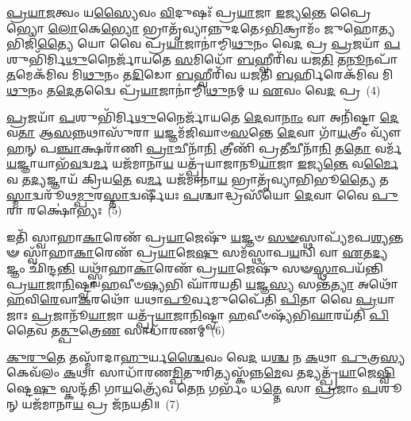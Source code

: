 \-\ul{𑌪𑍍𑌰}\-\-\ul{𑌯𑌾}\-\-\ul{𑌜}\-𑌤𑍍𑌵𑌂 𑌯\-\ul{𑌸𑍍𑌯𑍈}\-𑌵𑌂 \ul{𑌵𑌿}\-𑌦𑍁𑌷𑌃᳴ 𑌪𑍍𑌰\-\ul{𑌯𑌾}\-𑌜𑌾 \ul{𑌇}\-𑌜𑍍𑌯\-\ul{𑌨𑍍𑌤𑍇} 𑌪𑍍𑌰𑍈𑌭𑍍𑌯𑍋 \ul{𑌲𑍋}\-𑌕𑍇\-\ul{𑌭𑍍𑌯𑍋} 𑌭𑍍𑌰𑌾𑌤𑍃᳴𑌵𑍍𑌯𑌾𑌨𑍍𑌨𑍁𑌦𑌤𑍇\-𑌽\-\ul{𑌭𑌿}\-𑌕𑍍𑌰𑌾𑌮𑌂᳴ 𑌜𑍁𑌹𑍋\-\ul{𑌤𑍍𑌯}\-𑌭𑌿𑌜𑌿᳴\-\ul{𑌤𑍍𑌯𑍈} 𑌯𑍋 𑌵𑍈 𑌪𑍍𑌰᳴\-\ul{𑌯𑌾}\-𑌜𑌾𑌨𑌾॑𑌮𑍍𑌮𑌿\-\ul{𑌥𑍁}\-𑌨𑌂 𑌵𑍇\-\ul{𑌦} 𑌪𑍍𑌰 \ul{𑌪𑍍𑌰}\-𑌜𑌯𑌾᳴ \ul{𑌪}\-𑌶𑍁𑌭𑌿᳴𑌰𑍍𑌮𑌿\-\ul{𑌥𑍁}\-𑌨𑍈𑌰𑍍𑌜𑌾᳴𑌯𑌤𑍇 \ul{𑌸}\-𑌮𑌿𑌧𑍋᳴ \ul{𑌬}\-𑌹𑍍𑌵𑍀𑌰𑌿᳴𑌵 𑌯𑌜\-\ul{𑌤𑌿} 𑌤\-\ul{𑌨𑍂}\-𑌨𑌪𑌾᳴\-\ul{𑌤}\-𑌮𑍇𑌕᳴𑌮𑌿𑌵 𑌮𑌿\-\ul{𑌥𑍁}\-𑌨𑌂 𑌤\-\ul{𑌦𑌿}\-𑌡𑍋 \ul{𑌬}\-𑌹𑍍𑌵𑍀𑌰𑌿᳴𑌵 𑌯𑌜𑌤𑌿 \ul{𑌬}\-𑌰𑍍\mbox{}𑌹𑌿𑌰𑍇𑌕᳴𑌮𑌿𑌵 𑌮𑌿\-\ul{𑌥𑍁}\-𑌨𑌂 𑌤\-\ul{𑌦𑍇}\-𑌤𑌦𑍍𑌵𑍈 𑌪𑍍𑌰᳴\-\ul{𑌯𑌾}\-𑌜𑌾𑌨𑌾॑𑌮𑍍𑌮𑌿\-\ul{𑌥𑍁}\-𑌨𑌮𑍍 𑌯 \ul{𑌏}\-𑌵𑌂 𑌵𑍇\-\ul{𑌦} 𑌪𑍍𑌰~(4)

\-\ul{𑌪𑍍𑌰}\-𑌜𑌯𑌾᳴ \ul{𑌪}\-𑌶𑍁𑌭𑌿᳴𑌰𑍍𑌮𑌿\-\ul{𑌥𑍁}\-𑌨𑍈𑌰𑍍𑌜𑌾᳴𑌯𑌤𑍇 \ul{𑌦𑍇}\-𑌵𑌾\-\ul{𑌨𑌾𑌂} 𑌵𑌾 𑌅𑌨𑌿᳴𑌷𑍍𑌟𑌾 \ul{𑌦𑍇}\-𑌵\-\ul{𑌤𑌾} 𑌆\-\ul{𑌸}\-𑌨𑍍𑌨𑌥𑌾𑌸𑍁᳴𑌰𑌾 \ul{𑌯}\-𑌜𑍍𑌞𑌮᳴𑌜𑌿𑌘𑌾𑍞\-\ul{𑌸}\-𑌨𑍍𑌤𑍇 \ul{𑌦𑍇}\-𑌵𑌾 𑌗𑌾᳴\-\ul{𑌯}\-𑌤𑍍𑌰𑍀𑌂 𑌵𑍍𑌯𑍗᳴\-\ul{𑌹}\-𑌨𑍍 𑌪\-\ul{𑌞𑍍𑌚𑌾}\-𑌕𑍍𑌷𑌰𑌾᳴𑌣𑌿 \ul{𑌪𑍍𑌰𑌾}\-𑌚𑍀𑌨𑌾᳴\-\ul{𑌨𑌿} 𑌤𑍍𑌰𑍀𑌣𑌿᳴ 𑌪𑍍𑌰\-\ul{𑌤𑍀}\-𑌚𑍀𑌨𑌾᳴\-\ul{𑌨𑌿} 𑌤\-\ul{𑌤𑍋} 𑌵𑌰𑍍𑌮᳴ \ul{𑌯}\-𑌜𑍍𑌞𑌾𑌯𑌾𑌭᳴\-\ul{𑌵}\-𑌦𑍍𑌵\-\ul{𑌰𑍍𑌮} 𑌯𑌜᳴𑌮𑌾𑌨𑌾\-\ul{𑌯} 𑌯𑌤𑍍𑌪𑍍𑌰᳴𑌯𑌾𑌜𑌾𑌨𑍂\-\ul{𑌯𑌾}\-𑌜𑌾 \ul{𑌇}\-𑌜𑍍𑌯\-\ul{𑌨𑍍𑌤𑍇} 𑌵\-\ul{𑌰𑍍𑌮𑍈}\-𑌵 𑌤\-\ul{𑌦𑍍𑌯}\-𑌜𑍍𑌞𑌾𑌯᳴ 𑌕𑍍𑌰𑌿𑌯\-\ul{𑌤𑍇} 𑌵\-\ul{𑌰𑍍𑌮} 𑌯𑌜᳴𑌮𑌾𑌨𑌾\-\ul{𑌯} 𑌭𑍍𑌰𑌾𑌤𑍃᳴𑌵𑍍𑌯𑌾𑌭𑌿𑌭𑍂\-\ul{𑌤𑍍𑌯𑍈} 𑌤\-\ul{𑌸𑍍𑌮𑌾}\-𑌦𑍍𑌵𑌰𑍂᳴𑌥\-\ul{𑌮𑍍𑌪𑍁}\-𑌰\-\ul{𑌸𑍍𑌤𑌾}\-𑌦𑍍𑌵𑌰𑍍\mbox{}𑌷𑍀᳴𑌯𑌃 \ul{𑌪}\-𑌶𑍍𑌚𑌾𑌦𑍍𑌧𑍍𑌰𑌸𑍀᳴𑌯𑍋 \ul{𑌦𑍇}\-𑌵𑌾 𑌵𑍈 \ul{𑌪𑍁}\-𑌰𑌾 𑌰𑌕𑍍𑌷𑍋॑𑌭𑍍𑌯𑌃~(5)

𑌇𑌤𑌿᳴ 𑌸𑍍𑌵𑌾𑌹𑌾\-\ul{𑌕𑌾}\-𑌰𑍇𑌣᳴ 𑌪𑍍𑌰\-\ul{𑌯𑌾}\-𑌜𑍇𑌷𑍁᳴ \ul{𑌯}\-𑌜𑍍𑌞𑍞 \ul{𑌸}\-\-\ul{𑍟}\-𑌸𑍍𑌥𑌾𑌪𑍍𑌯᳴𑌮𑌪\-\ul{𑌶𑍍𑌯}\-𑌨𑍍𑌤𑍟 𑌸𑍍𑌵𑌾᳴𑌹𑌾\-\ul{𑌕𑌾}\-𑌰𑍇𑌣᳴ 𑌪𑍍𑌰\-\ul{𑌯𑌾}\-𑌜𑍇\-\ul{𑌷𑍁} 𑌸𑌮᳴𑌸𑍍𑌥𑌾𑌪\-\ul{𑌯}\-𑌨𑍍𑌵𑌿 𑌵𑌾 \ul{𑌏}\-𑌤\-\ul{𑌦𑍍𑌯}\-𑌜𑍍𑌞𑌂 𑌛𑌿᳴𑌨𑍍𑌦\-\ul{𑌨𑍍𑌤𑌿} 𑌯𑌥𑍍𑌸𑍍𑌵𑌾᳴𑌹𑌾\-\ul{𑌕𑌾}\-𑌰𑍇𑌣᳴ 𑌪𑍍𑌰\-\ul{𑌯𑌾}\-𑌜𑍇𑌷𑍁᳴ 𑌸𑍟\-\ul{𑌸𑍍𑌥𑌾}\-𑌪𑌯᳴𑌨𑍍𑌤𑌿 𑌪𑍍𑌰\-\ul{𑌯𑌾}\-𑌜𑌾\-\ul{𑌨𑌿}\-𑌷𑍍𑌟𑍍𑌵𑌾 \ul{𑌹}\-𑌵𑍀𑍞\-\ul{𑌷𑍍𑌯}\-𑌭𑌿 𑌘𑌾᳴𑌰𑌯𑌤𑌿 \ul{𑌯}\-𑌜𑍍𑌞\-\ul{𑌸𑍍𑌯} 𑌸𑌨𑍍𑌤᳴\-\ul{𑌤𑍍𑌯𑌾} 𑌅𑌥𑍋᳴ \ul{𑌹}\-𑌵𑌿\-\ul{𑌰𑍇}\-𑌵𑌾\-\ul{𑌕}\-𑌰𑌥𑍋᳴ 𑌯𑌥𑌾\-\ul{𑌪𑍂}\-𑌰𑍍𑌵𑌮𑍁𑌪𑍈᳴𑌤𑌿 \ul{𑌪𑌿}\-𑌤𑌾 𑌵𑍈 \ul{𑌪𑍍𑌰}\-𑌯𑌾𑌜𑌾𑌃 \ul{𑌪𑍍𑌰}\-𑌜𑌾𑌨𑍂᳴\-\ul{𑌯𑌾}\-𑌜𑌾 𑌯𑌤𑍍𑌪𑍍𑌰᳴\-\ul{𑌯𑌾}\-𑌜𑌾\-\ul{𑌨𑌿}\-𑌷𑍍𑌟𑍍𑌵𑌾 \ul{𑌹}\-𑌵𑍀𑍞𑌷𑍍𑌯᳴𑌭𑌿\-\ul{𑌘𑌾}\-𑌰𑌯᳴𑌤𑌿 \ul{𑌪𑌿}\-𑌤𑍈𑌵 𑌤\-\ul{𑌤𑍍𑌪𑍁}\-𑌤𑍍𑌰𑍇\-\ul{𑌣} 𑌸𑌾𑌧𑌾᳴𑌰𑌣𑌮𑍍~(6)

\-\ul{𑌕𑍁}\-\-\ul{𑌰𑍁}\-\-\ul{𑌤𑍇} 𑌤𑌸𑍍𑌮𑌾᳴𑌦𑌾\-\ul{𑌹𑍁}\-𑌰𑍍𑌯\-\ul{𑌶𑍍𑌚𑍈}\-𑌵𑌂 𑌵𑍇\-\ul{𑌦} 𑌯\-\ul{𑌶𑍍𑌚} 𑌨 \ul{𑌕}\-𑌥𑌾 \ul{𑌪𑍁}\-𑌤𑍍𑌰\-\ul{𑌸𑍍𑌯} 𑌕𑍇𑌵᳴𑌲𑌂 \ul{𑌕}\-𑌥𑌾 𑌸𑌾𑌧𑌾᳴𑌰𑌣\-\ul{𑌮𑍍𑌪𑌿}\-𑌤𑍁𑌰𑌿𑌤𑍍𑌯𑌸𑍍𑌕᳴𑌨𑍍𑌨\-\ul{𑌮𑍇}\-𑌵 𑌤𑌦𑍍𑌯𑌤𑍍𑌪𑍍𑌰᳴\-\ul{𑌯𑌾}\-𑌜𑍇\-\ul{𑌷𑍍𑌵𑌿}\-𑌷𑍍𑌟𑍇\-\ul{𑌷𑍁} 𑌸𑍍𑌕𑌨𑍍𑌦᳴𑌤𑌿 𑌗𑌾\-\ul{𑌯}\-𑌤𑍍𑌰𑍍𑌯𑍇᳴𑌵 𑌤𑍇\-\ul{𑌨} 𑌗𑌰𑍍𑌭𑌂᳴ 𑌧\-\ul{𑌤𑍍𑌤𑍇} 𑌸𑌾 \ul{𑌪𑍍𑌰}\-𑌜𑌾𑌂 \ul{𑌪}\-𑌶𑍂𑌨𑍍 𑌯𑌜᳴𑌮𑌾𑌨𑌾\-\ul{𑌯} 𑌪𑍍𑌰 𑌜᳴𑌨𑌯𑌤𑌿॥~(7)

{}%

